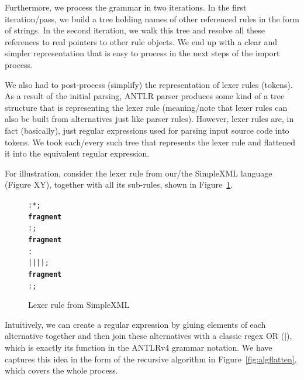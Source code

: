 Furthermore, we process the grammar in two iterations.
In the first iteration/pass, we build a tree holding names of other referenced rules in the form of strings.
In the second iteration, we walk this tree and resolve all these references to real pointers to other rule objects.
We end up with a clear and simpler representation that is easy to process in the next steps of the import process.

We also had to post-process (simplify) the representation of lexer rules (tokens).
As a result of the initial parsing, ANTLR parser produces some kind of a tree structure that is representing the lexer rule (meaning/note that lexer rules can also be built from alternatives just like parser rules).
However, lexer rules are, in fact (basically), just regular expressions used for parsing input source code into tokens.
We took each/every such tree that represents the lexer rule and flattened it into the equivalent regular expression.

For illustration, consider the lexer rule  from our/the SimpleXML language (Figure XY), together with all its sub-rules, shown in Figure~\ref{fig:lexerrule}.

\begin{figure}[ht]
\centering
\begin{framed}
\begin{alltt}
	     :  * ;
	\textbf{fragment}
	    : \antlrregex{[0-9]} ;
	\textbf{fragment}
	 :  
	         | \antlrliteral{-} | \antlrliteral{{\_}} |  |  ;
	\textbf{fragment}
	 : \antlrregex{[:a-zA-Z]} ;
\end{alltt}
\end{framed}
\caption{Lexer rule from SimpleXML}
\label{fig:lexerrule}
\end{figure}

Intuitively, we can create a regular expression by gluing elements of each alternative together and then join these alternatives with a classic regex OR ($|$), which is exactly its function in the ANTLRv4 grammar notation.
We have captures this idea in the form of the recursive algorithm in Figure~\ref{fig:algflatten}, which covers the whole process.

